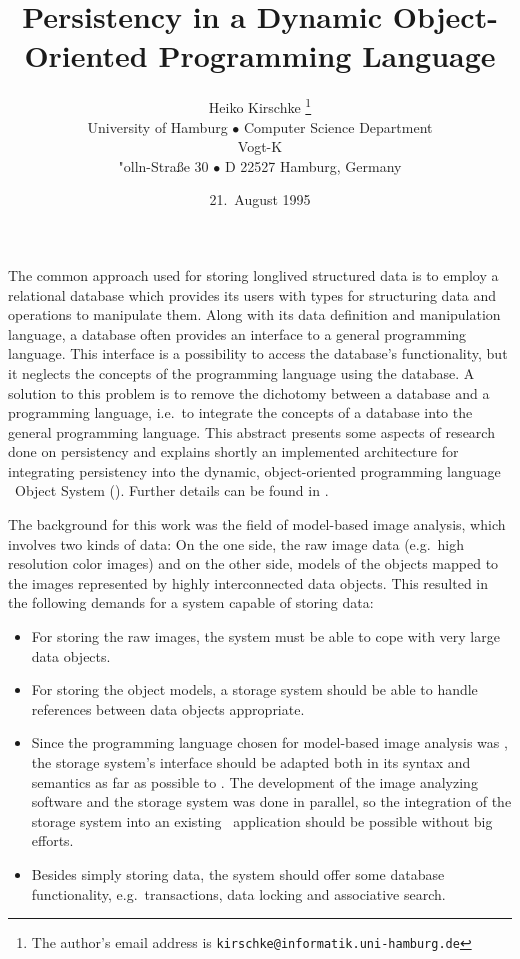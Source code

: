 \documentclass[a4paper%
]{article}
\title{%
Persistency in a Dynamic Object-Oriented Programming Language}
\author{%
Heiko Kirschke%
\thanks{The author's email address is
\texttt{kirschke@informatik.uni-hamburg.de}}%
\\[\smallskipamount]
\small University of Hamburg $\bullet$
Computer Science Department\vspace{-0.25\baselineskip}\\
\small Vogt-K\\"{o}lln-Stra\ss{}e 30 $\bullet$
D 22527 Hamburg, Germany}%
\date{21.\ August 1995}
\begin{document}
%
\maketitle
%
%
\noindent%
The common approach used for storing longlived structured data is to
employ a relational database which provides its users with types for
structuring data and operations to manipulate them.  Along with its
data definition and manipulation language, a database often provides
an interface to a general programming language.  This interface is a
possibility to access the database's functionality, but it neglects
the concepts of the programming language using the database.  A
solution to this problem is to remove the dichotomy between a database
and a programming language, i.e.\ to integrate the concepts of a
database into the general programming language.  This abstract
presents some aspects of research done on persistency and explains
shortly an implemented architecture for integrating persistency into
the dynamic, object-oriented programming language \cl\ Object System
(\clos).  Further details can be found in
\cite{bib:ki94a,bib:ki94b,bib:ki95}.
%
\par{}The background for this work was the field of model-based image
analysis, which involves two kinds of data: On the one side, the raw
image data (e.g.\ high resolution color images) and on the other side,
models of the objects mapped to the images represented by highly
interconnected data objects.  This resulted in the following demands
for a system capable of storing data:
%
\begin{itemize}
%
\item For storing the raw images, the system must be able to cope with
very large data objects.
%
\item For storing the object models, a storage system should be able to
handle references between data objects appropriate.
%
\item Since the programming language chosen for model-based image
analysis was \clos, the storage system's interface should be adapted
both in its syntax and semantics as far as possible to \clos.  The
development of the image analyzing software and the storage system was
done in parallel, so the integration of the storage system into an
existing \clos\ application should be possible without big efforts.
%
\item Besides simply storing data, the system should offer some
database functionality, e.g.\ transactions, data locking and
associative search.
%
\end{itemize}
\end{document}
